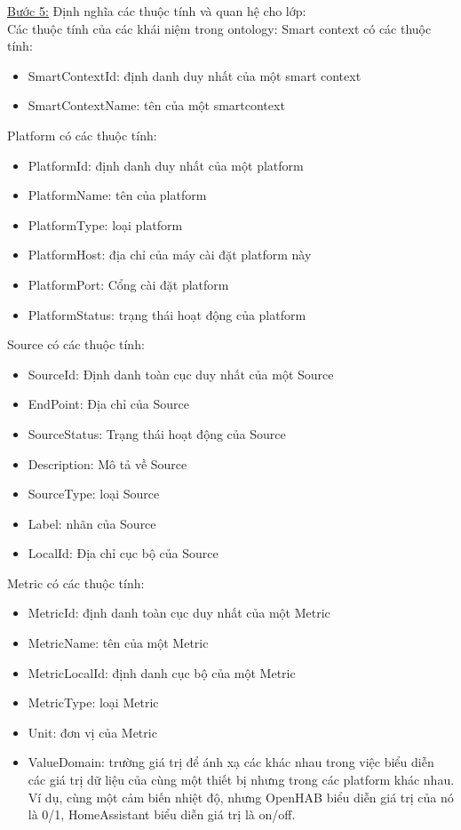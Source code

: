\underline{Bước 5:} Định nghĩa các thuộc tính và quan hệ cho lớp:	\\
Các thuộc tính của các khái niệm trong ontology:
\hspace{0mm}Smart context có các thuộc tính:
\begin{itemize}
	\item SmartContextId: định danh duy nhất của một smart context
	\item SmartContextName: tên của một smartcontext
\end{itemize} 

\hspace{0mm}Platform có các thuộc tính:
\begin{itemize}
	\item PlatformId: định danh duy nhất của một platform
	\item PlatformName: tên của platform
	\item PlatformType: loại platform
	\item PlatformHost: địa chỉ của máy cài đặt platform này
	\item PlatformPort: Cổng cài đặt platform	
	\item PlatformStatus: trạng thái hoạt động của platform
\end{itemize}

\hspace{0mm}Source có các thuộc tính:
\begin{itemize}
	\item SourceId: Định danh toàn cục duy nhất của một Source
	\item EndPoint: Địa chỉ của Source
	\item SourceStatus: Trạng thái hoạt động của Source
	\item Description: Mô tả về Source
	\item SourceType: loại Source	
	\item Label: nhãn của Source
	\item LocalId: Địa chỉ cục bộ của Source
\end{itemize}



\hspace{0mm}Metric có các thuộc tính:
\begin{itemize}
	\item MetricId: định danh toàn cục duy nhất của một Metric
	\item MetricName: tên của một Metric
	\item MetricLocalId: định danh cục bộ của một Metric
	\item MetricType: loại Metric
	\item Unit: đơn vị của Metric
	\item ValueDomain: trường giá trị để ánh xạ các khác nhau trong việc biểu diễn các giá trị dữ liệu của cùng một thiết bị nhưng trong các platform khác nhau. Ví dụ, cùng một cảm biến nhiệt độ, nhưng OpenHAB biểu diễn giá trị của nó là 0/1, HomeAssistant biểu diễn giá trị là on/off.
\end{itemize}



